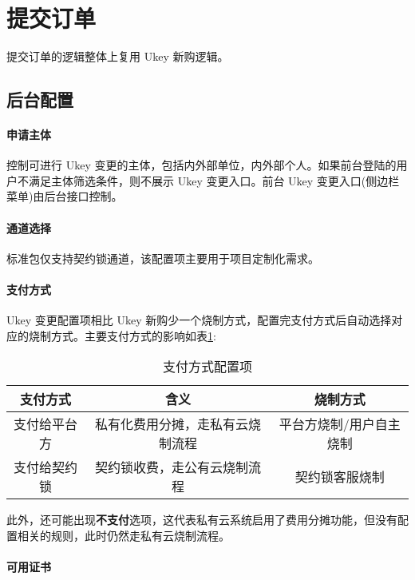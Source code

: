 \section{提交订单}

提交订单的逻辑整体上复用 Ukey 新购逻辑。

\subsection{后台配置}

\paragraph*{申请主体}

控制可进行 Ukey 变更的主体，包括内外部单位，内外部个人。如果前台登陆的用户不满足主体筛选条件，则不展示 Ukey 变更入口。前台 Ukey 变更入口(侧边栏菜单)由后台接口控制。

\paragraph*{通道选择}

标准包仅支持契约锁通道，该配置项主要用于项目定制化需求。

\paragraph*{支付方式}

Ukey 变更配置项相比 Ukey 新购少一个烧制方式，配置完支付方式后自动选择对应的烧制方式。主要支付方式的影响如表\ref{table:支付方式配置项}:

\begin{table}[H]
  \small
  \centering
  \caption{支付方式配置项}
  \label{table:支付方式配置项}
  \setlength{\tabcolsep}{4mm}
  \begin{tabular}{c|cc}
    \toprule
    \textbf{支付方式} & \textbf{含义} & \textbf{烧制方式} \\
    \midrule
    支付给平台方 & 私有化费用分摊，走私有云烧制流程 & 平台方烧制/用户自主烧制 \\
    支付给契约锁 & 契约锁收费，走公有云烧制流程 & 契约锁客服烧制 \\
    \bottomrule
  \end{tabular}
\end{table}

此外，还可能出现\textbf{不支付}选项，这代表私有云系统启用了费用分摊功能，但没有配置相关的规则，此时仍然走私有云烧制流程。

\paragraph*{可用证书}

